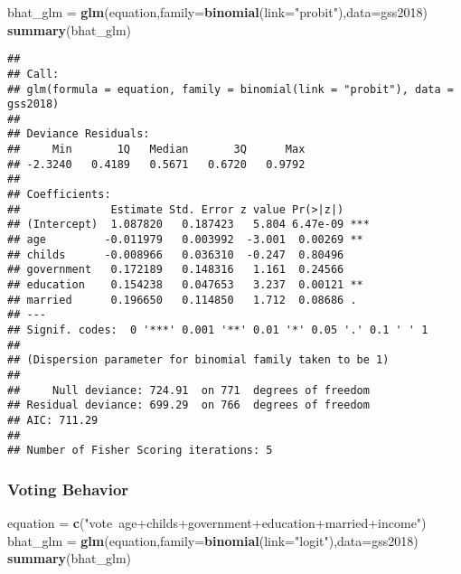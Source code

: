 \documentclass[
]{article}
\newenvironment{Shaded}{\begin{snugshade}}{\end{snugshade}}
\newcommand{\DataTypeTok}[1]{\textcolor[rgb]{0.13,0.29,0.53}{#1}}
\newcommand{\KeywordTok}[1]{\textcolor[rgb]{0.13,0.29,0.53}{\textbf{#1}}}
\newcommand{\NormalTok}[1]{#1}
\newcommand{\StringTok}[1]{\textcolor[rgb]{0.31,0.60,0.02}{#1}}
\begin{document}
\begin{Shaded}
\begin{Highlighting}[]
\NormalTok{bhat_glm =}\StringTok{ }\KeywordTok{glm}\NormalTok{(equation,}\DataTypeTok{family=}\KeywordTok{binomial}\NormalTok{(}\DataTypeTok{link=}\StringTok{"probit"}\NormalTok{),}\DataTypeTok{data=}\NormalTok{gss2018)}
\KeywordTok{summary}\NormalTok{(bhat_glm)}
\end{Highlighting}
\end{Shaded}

\begin{verbatim}
## 
## Call:
## glm(formula = equation, family = binomial(link = "probit"), data = gss2018)
## 
## Deviance Residuals: 
##     Min       1Q   Median       3Q      Max  
## -2.3240   0.4189   0.5671   0.6720   0.9792  
## 
## Coefficients:
##              Estimate Std. Error z value Pr(>|z|)    
## (Intercept)  1.087820   0.187423   5.804 6.47e-09 ***
## age         -0.011979   0.003992  -3.001  0.00269 ** 
## childs      -0.008966   0.036310  -0.247  0.80496    
## government   0.172189   0.148316   1.161  0.24566    
## education    0.154238   0.047653   3.237  0.00121 ** 
## married      0.196650   0.114850   1.712  0.08686 .  
## ---
## Signif. codes:  0 '***' 0.001 '**' 0.01 '*' 0.05 '.' 0.1 ' ' 1
## 
## (Dispersion parameter for binomial family taken to be 1)
## 
##     Null deviance: 724.91  on 771  degrees of freedom
## Residual deviance: 699.29  on 766  degrees of freedom
## AIC: 711.29
## 
## Number of Fisher Scoring iterations: 5
\end{verbatim}

\hypertarget{voting-behavior}{%
\subsubsection{Voting Behavior}\label{voting-behavior}}

\begin{Shaded}
\begin{Highlighting}[]
\NormalTok{equation =}\StringTok{ }\KeywordTok{c}\NormalTok{(}\StringTok{"vote~age+childs+government+education+married+income"}\NormalTok{)}
\NormalTok{bhat_glm =}\StringTok{ }\KeywordTok{glm}\NormalTok{(equation,}\DataTypeTok{family=}\KeywordTok{binomial}\NormalTok{(}\DataTypeTok{link=}\StringTok{"logit"}\NormalTok{),}\DataTypeTok{data=}\NormalTok{gss2018)}
\KeywordTok{summary}\NormalTok{(bhat_glm)}
\end{Highlighting}
\end{Shaded}
\end{document}
